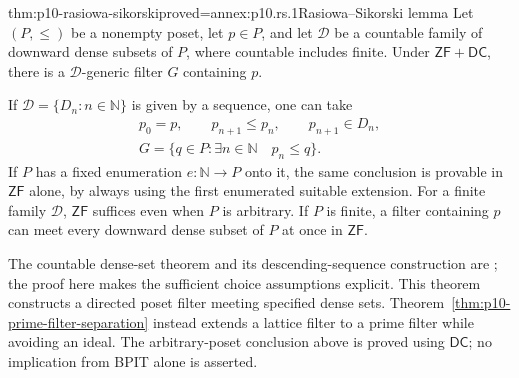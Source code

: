 \begin{hblemma}{thm:p10-rasiowa-sikorski}{proved=annex:p10.rs.1}{Rasiowa--Sikorski lemma}
Let \((P,\leq)\) be a nonempty poset, let \(p\in P\), and let
\(\mathcal D\) be a countable family of downward dense subsets of
\(P\), where countable includes finite.
Under \(\mathsf{ZF}+\mathsf{DC}\), there is a
\(\mathcal D\)-generic filter \(G\) containing \(p\).

If \(\mathcal D=\{D_n:n\in\mathbb N\}\) is given by a sequence,
one can take
\[
\begin{gathered}
 p_0=p,\qquad p_{n+1}\leq p_n,\qquad p_{n+1}\in D_n,\\
 G=\{q\in P:\exists n\in\mathbb N\quad p_n\leq q\}.
\end{gathered}
\]
If \(P\) has a fixed enumeration \(e:\mathbb N\to P\) onto it,
the same conclusion is provable in \(\mathsf{ZF}\) alone, by always
using the first enumerated suitable extension.
For a finite family \(\mathcal D\), \(\mathsf{ZF}\) suffices even
when \(P\) is arbitrary.  If \(P\) is finite, a filter containing
\(p\) can meet every downward dense subset of \(P\) at once in
\(\mathsf{ZF}\).
\end{hblemma}

The countable dense-set theorem and its descending-sequence construction
are \cite[Theorem~8.1.2, pp.~132--133]{Ciesielski1997}; the proof here
makes the sufficient choice assumptions explicit.
This theorem constructs a directed poset filter meeting specified dense
sets.  Theorem~\ref{thm:p10-prime-filter-separation} instead extends a
lattice filter to a prime filter while avoiding an ideal.
The arbitrary-poset conclusion above is proved using \(\mathsf{DC}\);
no implication from BPIT alone is asserted.
